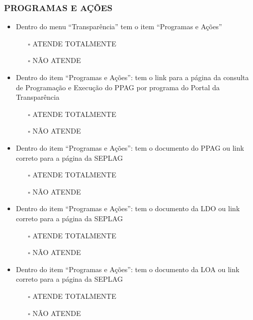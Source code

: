 \documentclass[
]{book}
\providecommand{\tightlist}{%
  \setlength{\itemsep}{0pt}\setlength{\parskip}{0pt}}
\begin{document}
\hypertarget{programas-e-auxe7uxf5es-1}{%
\subsubsection*{PROGRAMAS E AÇÕES}\label{programas-e-auxe7uxf5es-1}}

\begin{itemize}
\tightlist
\item
  Dentro do menu ``Transparência'' tem o item ``Programas e Ações''

  \begin{itemize}
  \tightlist
  \item[$\square$]
    ATENDE TOTALMENTE
  \item[$\square$]
    NÃO ATENDE
  \end{itemize}
\item
  Dentro do item ``Programas e Ações'': tem o link para a página da consulta de Programação e Execução do PPAG por programa do Portal da Transparência

  \begin{itemize}
  \tightlist
  \item[$\square$]
    ATENDE TOTALMENTE
  \item[$\square$]
    NÃO ATENDE
  \end{itemize}
\item
  Dentro do item ``Programas e Ações'': tem o documento do PPAG ou link correto para a página da SEPLAG

  \begin{itemize}
  \tightlist
  \item[$\square$]
    ATENDE TOTALMENTE
  \item[$\square$]
    NÃO ATENDE
  \end{itemize}
\item
  Dentro do item ``Programas e Ações'': tem o documento da LDO ou link correto para a página da SEPLAG

  \begin{itemize}
  \tightlist
  \item[$\square$]
    ATENDE TOTALMENTE
  \item[$\square$]
    NÃO ATENDE
  \end{itemize}
\item
  Dentro do item ``Programas e Ações'': tem o documento da LOA ou link correto para a página da SEPLAG

  \begin{itemize}
  \tightlist
  \item[$\square$]
    ATENDE TOTALMENTE
  \item[$\square$]
    NÃO ATENDE
  \end{itemize}
\end{itemize}
\end{document}
